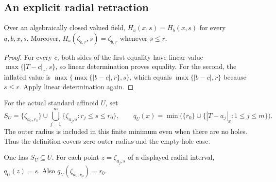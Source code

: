 \subsection{An explicit radial retraction}\label{subsec:fc-line-skeleton}

\begin{lemma}\label{lem:fc-inflation-centre-independent}
\leanok
{}
Over an algebraically closed valued field, $H_a(x,s)=H_b(x,s)$ for every
$a,b,x,s$. Moreover, $H_a(\zeta_{b,r},s)=\zeta_{b,r}$ whenever $s\le r$.
\end{lemma}

\begin{proof}
For every $c$, both sides of the first equality have linear value
$\max\{|T-c|_x,s\}$, so linear determination proves equality. For the second,
the inflated value is $\max\{\max\{|b-c|,r\},s\}$, which equals
$\max\{|b-c|,r\}$ because $s\le r$. Apply linear determination again.
\end{proof}

\begin{definition}\label{def:fc-radial-skeleton}
\leanok
{}
For the actual standard affinoid $U$, set
\[
 S_U=\{\zeta_{a_0,r_0}\}\cup
 \bigcup_{j=1}^m\{\zeta_{a_j,s}:r_j\le s\le r_0\},\qquad
 q_U(x)=\min\bigl(\{r_0\}\cup\{|T-a_j|_x:1\le j\le m\}\bigr).
\]
The outer radius is included in this finite minimum even when there are no
holes. Thus the definition covers zero outer radius and the empty-hole case.
\end{definition}

\begin{lemma}\label{lem:fc-radial-skeleton-subset}
\leanok
{}
One has $S_U\subseteq U$. For each point $z=\zeta_{a_j,s}$ of a displayed
radial interval, $q_U(z)=s$. Also $q_U(\zeta_{a_0,r_0})=r_0$.
\end{lemma}


